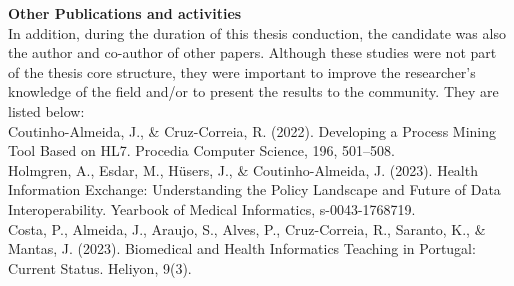 \textbf{Other Publications and activities}\\
In addition, during the duration of this thesis conduction, the candidate was also the author and co-author of other papers. Although these studies were not part of the thesis core structure, they were important to improve the researcher's knowledge of the field and/or to present the results to the community. They are listed below:\\


Coutinho-Almeida, J., \& Cruz-Correia, R. (2022). Developing a Process Mining Tool Based on HL7. Procedia Computer Science, 196, 501–508.\\


Holmgren, A., Esdar, M., Hüsers, J., \& Coutinho-Almeida, J. (2023). Health Information Exchange: Understanding the Policy Landscape and Future of Data Interoperability. Yearbook of Medical Informatics, s-0043-1768719.\\



Costa, P., Almeida, J., Araujo, S., Alves, P., Cruz-Correia, R., Saranto, K., \& Mantas, J. (2023). Biomedical and Health Informatics Teaching in Portugal: Current Status. Heliyon, 9(3).\\


